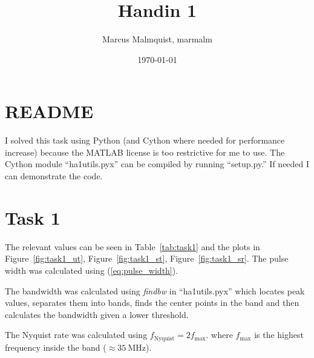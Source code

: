 \documentclass[12pt,a4paper]{article}
\title{Handin 1}
\author{Marcus Malmquist, marmalm}
\date{\today}
\begin{document}
\maketitle

\section{README}
I solved this task using Python (and Cython where needed for performance increase) because the MATLAB license is too restrictive for me to use. The Cython module ``ha1utils.pyx'' can be compiled by running ``setup.py.'' If needed I can demonstrate the code.

\section{Task 1}\label{sec:1}
The relevant values can be seen in Table~\ref{tab:task1} and the plots in Figure~\ref{fig:task1_ut}, Figure~\ref{fig:task1_st}, Figure~\ref{fig:task1_sr}.
The pulse width was calculated using (\ref{eq:pulse_width}).

The bandwidth was calculated using \textit{findbw} in ``ha1utils.pyx'' which locates peak values, separates them into bands, finds the center points in the band and then calculates the bandwidth given a lower threshold.

The Nyquist rate was calculated using $f_\text{Nyquist}=2f_\text{max}$. where $f_\text{max}$ is the highest frequency inside the band ($\approx \SI{35}{\mega\hertz}$).
\end{document}
